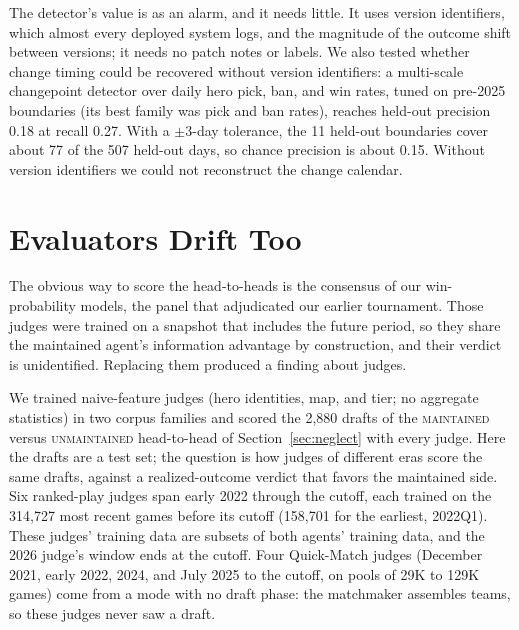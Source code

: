 \documentclass[journal]{IEEEtran}
\newcommand{\maintained}{\textsc{maintained}}          %
\newcommand{\stalefour}{\textsc{unmaintained}}          %
\begin{document}
The detector's value is as an alarm, and it needs little. It uses
version identifiers, which almost every deployed system logs, and the
magnitude of the outcome shift between versions; it needs no patch
notes or labels. We also tested whether change timing could be recovered
without version identifiers: a multi-scale changepoint detector over
daily hero pick, ban, and win rates, tuned on pre-2025 boundaries (its
best family was pick and ban rates), reaches held-out precision 0.18 at
recall 0.27. With a $\pm$3-day tolerance, the 11 held-out boundaries
cover about 77 of the 507 held-out days, so chance precision is about
0.15. Without
version identifiers we could not reconstruct the change calendar.

\section{Evaluators Drift Too}
\label{sec:vintage}

The obvious way to score the head-to-heads is the consensus of our
win-probability models, the panel that adjudicated our earlier
tournament. Those judges were trained on a snapshot that includes the
future period, so they share the maintained agent's information
advantage by construction, and their verdict is unidentified. Replacing
them produced a finding about judges.

We trained naive-feature judges (hero identities, map, and tier; no
aggregate statistics) in two corpus families and scored the 2{,}880
drafts of the \maintained{} versus \stalefour{} head-to-head of
Section~\ref{sec:neglect} with every judge. Here the drafts are a test
set; the question is how judges of different eras score the same
drafts, against a realized-outcome verdict that favors the maintained
side. Six ranked-play judges span early 2022 through the cutoff, each
trained on the 314{,}727 most recent games before its cutoff (158{,}701
for the earliest, 2022Q1). These judges' training data are subsets of
both agents' training data, and the 2026 judge's window ends at the
cutoff. Four Quick-Match judges (December 2021, early 2022, 2024, and
July 2025 to the cutoff, on pools of 29K to 129K games) come from a mode
with no draft phase: the matchmaker assembles teams, so these judges
never saw a draft.
\end{document}
